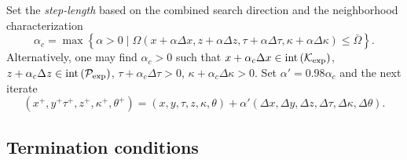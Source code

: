 \documentclass[10pt]{article}
\theoremstyle{definition}
\theoremstyle{plain}
\def\interior{\protect{\textnormal{int}}}
\begin{document}
Set the \textit{step-length} based on the combined search direction and the neighborhood characterization
\[\alpha_c = \max\left\{ \alpha >0 \mid \Omega(x+\alpha \Delta x, z+\alpha \Delta z, \tau + \alpha \Delta \tau, \kappa + \alpha \Delta \kappa) \leq \bar{\Omega} \right\}.\]
Alternatively, one may find $\alpha_c>0$ such that $x + \alpha_c \Delta x \in \interior \left(\mathcal{K}_{\exp}\right)$, $z + \alpha_c \Delta z \in \interior \left(\mathcal{P}_{\exp}\right)$, $\tau + \alpha_c \Delta \tau > 0$, $\kappa + \alpha_c \Delta \kappa > 0$.
Set $\alpha' = 0.98 \alpha_c$ and the next iterate 
\[(x^+, y^+ \tau^+, z^+,\kappa^+, \theta^+) = (x,y, \tau, z,\kappa, \theta)+\alpha' (\Delta x, \Delta y, \Delta z, \Delta \tau, \Delta \kappa, \Delta \theta).\]
\subsection{Termination conditions}

\newpage
\appendix
\end{document}
